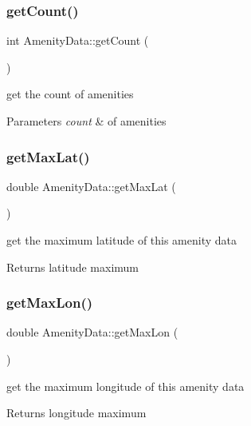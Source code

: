\subsubsection{\texorpdfstring{get\+Count()}{getCount()}}
{\footnotesize\ttfamily int Amenity\+Data\+::get\+Count (\begin{DoxyParamCaption}{ }\end{DoxyParamCaption})\hspace{0.3cm}{\ttfamily [inline]}}

get the count of amenities 
\begin{DoxyParams}{Parameters}
{\em count} & of amenities \\
\hline
\end{DoxyParams}
\mbox{\label{class_amenity_data_a14de1667bc8d9196b66d725a322e9df3}} 
\subsubsection{\texorpdfstring{get\+Max\+Lat()}{getMaxLat()}}
{\footnotesize\ttfamily double Amenity\+Data\+::get\+Max\+Lat (\begin{DoxyParamCaption}{ }\end{DoxyParamCaption})\hspace{0.3cm}{\ttfamily [inline]}}

get the maximum latitude of this amenity data \begin{DoxyReturn}{Returns}
latitude maximum 
\end{DoxyReturn}
\mbox{\label{class_amenity_data_a37a5f564a6500698778783edacce1e38}} 
\subsubsection{\texorpdfstring{get\+Max\+Lon()}{getMaxLon()}}
{\footnotesize\ttfamily double Amenity\+Data\+::get\+Max\+Lon (\begin{DoxyParamCaption}{ }\end{DoxyParamCaption})\hspace{0.3cm}{\ttfamily [inline]}}

get the maximum longitude of this amenity data \begin{DoxyReturn}{Returns}
longitude maximum 
\end{DoxyReturn}
\mbox{\label{class_amenity_data_a815a379eaba975a1c413efecef3c236a}} 
